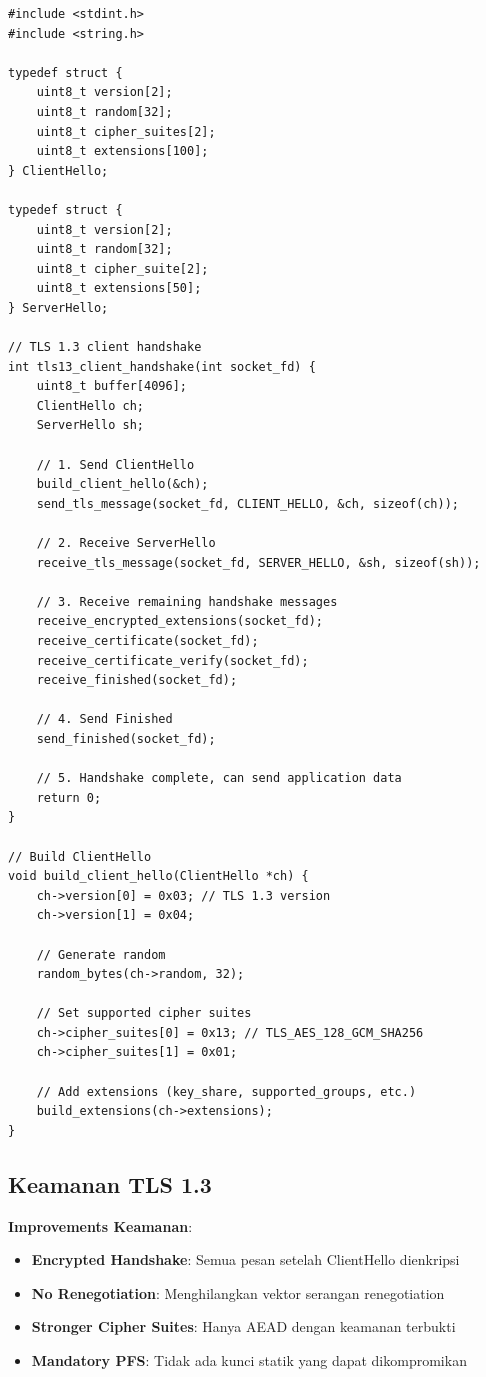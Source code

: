 \begin{lstlisting}[style=cstyle, caption={TLS 1.3 Client Implementation}]
#include <stdint.h>
#include <string.h>

typedef struct {
    uint8_t version[2];
    uint8_t random[32];
    uint8_t cipher_suites[2];
    uint8_t extensions[100];
} ClientHello;

typedef struct {
    uint8_t version[2];
    uint8_t random[32];
    uint8_t cipher_suite[2];
    uint8_t extensions[50];
} ServerHello;

// TLS 1.3 client handshake
int tls13_client_handshake(int socket_fd) {
    uint8_t buffer[4096];
    ClientHello ch;
    ServerHello sh;
    
    // 1. Send ClientHello
    build_client_hello(&ch);
    send_tls_message(socket_fd, CLIENT_HELLO, &ch, sizeof(ch));
    
    // 2. Receive ServerHello
    receive_tls_message(socket_fd, SERVER_HELLO, &sh, sizeof(sh));
    
    // 3. Receive remaining handshake messages
    receive_encrypted_extensions(socket_fd);
    receive_certificate(socket_fd);
    receive_certificate_verify(socket_fd);
    receive_finished(socket_fd);
    
    // 4. Send Finished
    send_finished(socket_fd);
    
    // 5. Handshake complete, can send application data
    return 0;
}

// Build ClientHello
void build_client_hello(ClientHello *ch) {
    ch->version[0] = 0x03; // TLS 1.3 version
    ch->version[1] = 0x04;
    
    // Generate random
    random_bytes(ch->random, 32);
    
    // Set supported cipher suites
    ch->cipher_suites[0] = 0x13; // TLS_AES_128_GCM_SHA256
    ch->cipher_suites[1] = 0x01;
    
    // Add extensions (key_share, supported_groups, etc.)
    build_extensions(ch->extensions);
}
\end{lstlisting}

\subsection{Keamanan TLS 1.3}

\textbf{Improvements Keamanan}:
\begin{itemize}
  \item \textbf{Encrypted Handshake}: Semua pesan setelah ClientHello dienkripsi
  \item \textbf{No Renegotiation}: Menghilangkan vektor serangan renegotiation
  \item \textbf{Stronger Cipher Suites}: Hanya AEAD dengan keamanan terbukti
  \item \textbf{Mandatory PFS}: Tidak ada kunci statik yang dapat dikompromikan
\end{itemize}

